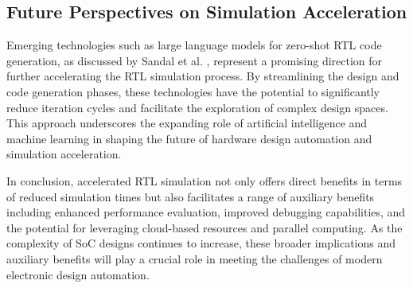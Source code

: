 \documentclass[conference]{IEEEtran}
\begin{document}
\subsection{Future Perspectives on Simulation Acceleration}

Emerging technologies such as large language models for zero-shot RTL code generation, as discussed by Sandal et al. \cite{sandalZeroShotRTLCode2024}, represent a promising direction for further accelerating the RTL simulation process. By streamlining the design and code generation phases, these technologies have the potential to significantly reduce iteration cycles and facilitate the exploration of complex design spaces. This approach underscores the expanding role of artificial intelligence and machine learning in shaping the future of hardware design automation and simulation acceleration.

In conclusion, accelerated RTL simulation not only offers direct benefits in terms of reduced simulation times but also facilitates a range of auxiliary benefits including enhanced performance evaluation, improved debugging capabilities, and the potential for leveraging cloud-based resources and parallel computing. As the complexity of SoC designs continues to increase, these broader implications and auxiliary benefits will play a crucial role in meeting the challenges of modern electronic design automation.




\end{document}
